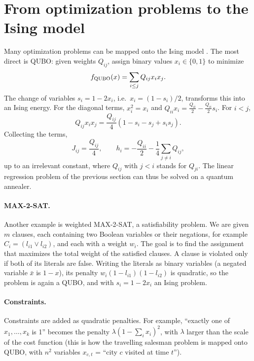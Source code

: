 \section{From optimization problems to the Ising model}
Many optimization problems can be mapped onto the Ising model \cite{Lucas2014}. The most direct is QUBO: given weights $Q_{ij}$, assign binary values $x_i\in\{0,1\}$ to minimize
\begin{equation}
  f_{\rm QUBO}(x)=\sum_{i\le j}Q_{ij}x_ix_j .
\end{equation}
The change of variables $s_i=1-2x_i$, i.e.\ $x_i=(1-s_i)/2$, transforms this into an Ising energy. For the diagonal terms, $x_i^2=x_i$ and $Q_{ii}x_i=\frac{Q_{ii}}2-\frac{Q_{ii}}2s_i$. For $i<j$,
\begin{equation}
  Q_{ij}x_ix_j=\frac{Q_{ij}}4\left(1-s_i-s_j+s_is_j\right).
\end{equation}
Collecting the terms,
\begin{equation}
  J_{ij}=\frac{Q_{ij}}4,\qquad h_i=-\frac{Q_{ii}}2-\frac14\sum_{j\neq i}Q_{ij},
\end{equation}
up to an irrelevant constant, where $Q_{ij}$ with $j<i$ stands for $Q_{ji}$. The linear regression problem of the previous section can thus be solved on a quantum annealer.

\paragraph{MAX-2-SAT.} Another example is weighted MAX-2-SAT, a satisfiability problem. We are given $m$ clauses, each containing two Boolean variables or their negations, for example $C_i=(l_{i1}\vee l_{i2})$, and each with a
weight $w_i$. The goal is to find the assignment that maximizes the total weight of the satisfied clauses. A clause is violated only if both of its literals are false. Writing the literals as binary variables (a negated variable
$\bar x$ is $1-x$), its penalty $w_i(1-l_{i1})(1-l_{i2})$ is quadratic, so the problem is again a QUBO, and with $s_i=1-2x_i$ an Ising problem.

\paragraph{Constraints.} Constraints are added as quadratic penalties. For example, ``exactly one of $x_1,\dots,x_k$ is 1'' becomes the penalty $\lambda(1-\sum_ix_i)^2$, with $\lambda$ larger than the scale of the cost function
(this is how the travelling salesman problem is mapped onto QUBO, with $n^2$ variables $x_{c,t}$ = ``city $c$ visited at time $t$'').

